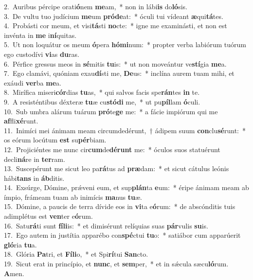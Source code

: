 {2.~}Auribus pércipe orati\textbf{ó}nem \textbf{me}am,~* non in lábi\textbf{is} do\textbf{ló}sis.\\
{3.~}De vultu tuo judícium \textbf{me}um \textbf{pró}\textbf{de}at:~* óculi tui vídeant \textbf{æ}qui\textbf{tá}tes.\\
{4.~}Probásti cor meum, et visi\textbf{tá}sti \textbf{no}cte:~* igne me examinásti, et non est invénta in \textbf{me} i\textbf{ní}quitas.\\
{5.~}Ut non loquátur os meum \textbf{ó}pera \textbf{hó}\textbf{mi}num:~* propter verba labiórum tuórum ego custodívi \textbf{vi}as \textbf{du}ras.\\
{6.~}Pérfice gressus meos in \textbf{sé}mitis \textbf{tu}is:~* ut non moveántur ve\textbf{stí}gia \textbf{me}a.\\
{7.~}Ego clamávi, quóniam exau\textbf{dí}sti me, \textbf{De}us:~* inclína aurem tuam mihi, et exáudi \textbf{ver}ba \textbf{me}a.\\
{8.~}Mirífica miseri\textbf{cór}dias \textbf{tu}as,~* qui salvos facis spe\textbf{rán}tes \textbf{in} te.\\
{9.~}A resisténtibus déxteræ \textbf{tu}æ cu\textbf{stó}\textbf{di} me,~* ut pu\textbf{píl}lam \textbf{ó}culi.\\
{10.~}Sub umbra alárum tuárum \textbf{pró}te\textbf{ge} me:~* a fácie impiórum qui me \textbf{af}fli\textbf{xé}runt.\\
{11.~}Inimíci mei ánimam meam circumdedérunt,~† ádipem suum \textbf{con}clu\textbf{sé}runt:~* os eórum locútum \textbf{est} su\textbf{pér}biam.\\
{12.~}Projiciéntes me nunc cir\textbf{cum}de\textbf{dé}\textbf{runt} me:~* óculos suos statuérunt decli\textbf{ná}re in \textbf{ter}ram.\\
{13.~}Suscepérunt me sicut leo pa\textbf{rá}tus ad \textbf{præ}dam:~* et sicut cátulus leónis hábi\textbf{tans} in \textbf{áb}ditis.\\
{14.~}Exsúrge, Dómine, prǽveni eum, et sup\textbf{plán}ta \textbf{e}um:~* éripe ánimam meam ab ímpio, frámeam tuam ab inimícis \textbf{ma}nus \textbf{tu}æ.\\
{15.~}Dómine, a paucis de terra dívide eos in \textbf{vi}ta e\textbf{ó}rum:~* de abscónditis tuis adimplétus est \textbf{ven}ter e\textbf{ó}rum.\\
{16.~}Satu\textbf{rá}ti sunt \textbf{fí}\textbf{li}is:~* et dimisérunt relíquias suas \textbf{pár}vulis \textbf{su}is.\\
{17.~}Ego autem in justítia apparébo con\textbf{spé}ctui \textbf{tu}o:~* satiábor cum apparúerit \textbf{gló}ria \textbf{tu}a.\\
{18.~}Glória \textbf{Pa}tri, et \textbf{Fí}\textbf{li}o,~* et Spi\textbf{rí}tui \textbf{San}cto.\\
{19.~}Sicut erat in princípio, et \textbf{nunc}, et \textbf{sem}per,~* et in sǽcula sæcu\textbf{ló}rum. \textbf{A}men.\\
